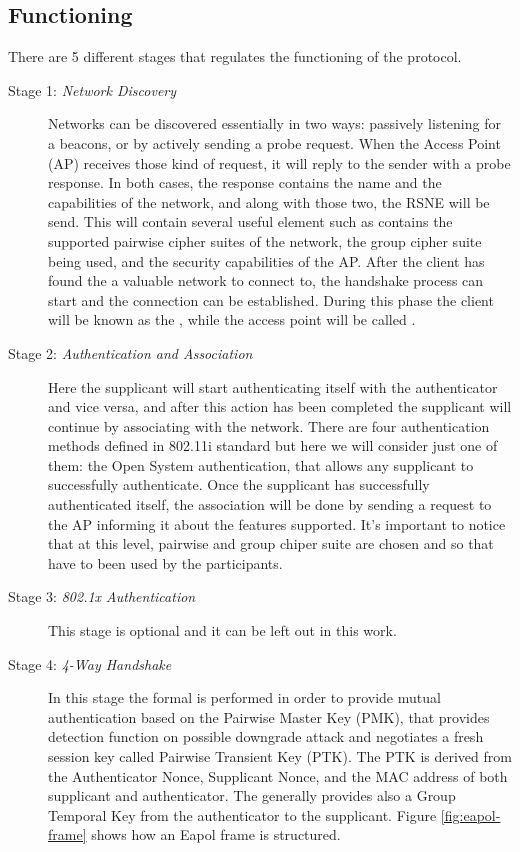 \subsection{Functioning}
There are 5 different stages that regulates the functioning of the \fwh protocol.
\begin{description}
  

\item [Stage 1: \textit{Network Discovery}]

Networks can be discovered essentially in two ways: passively listening for a beacons, or by actively sending a probe request. When the Access Point (AP) receives those kind of request, it will reply 
to the sender with a probe response. In both cases, the response contains the name and the capabilities of the network, and along with those two, the RSNE will be send.
This will contain several useful element such as contains the supported pairwise cipher suites of the network, the group cipher suite being used, and the security capabilities of the AP.
After the client has found the a valuable network to connect to, the handshake process can start and the connection can be established.
During this phase the client will be known as the , while the access point will be called .

\item[Stage 2: \textit{Authentication and Association}]

Here the supplicant will start authenticating itself with the authenticator and vice versa, and after this action has been completed the supplicant will continue by associating with the network.
There are four authentication methods defined in 802.11i standard but here we will consider just one of them: the Open System authentication, that allows any supplicant to successfully authenticate.
Once the supplicant has successfully authenticated itself, the association will be done by sending a request to the AP informing it about the features supported. It's important to notice that at this level,
pairwise and group chiper suite are chosen and so that have to been used by the participants. 

\item[Stage 3: \textit{802.1x Authentication}]

This stage is optional and it can be left out in this work.

\item[Stage 4: \textit{4-Way Handshake}] 

In this stage the formal \fwh is performed in order to provide mutual authentication based on the Pairwise Master Key (PMK), that provides detection function on possible downgrade attack and negotiates a fresh session key called Pairwise Transient Key (PTK).
The PTK is derived from the Authenticator Nonce, Supplicant Nonce, and the MAC address of both supplicant and authenticator. The \fwh generally provides also a Group Temporal Key from the authenticator to the supplicant. Figure \ref{fig:eapol-frame} shows how an Eapol frame is structured.


\end{description}
